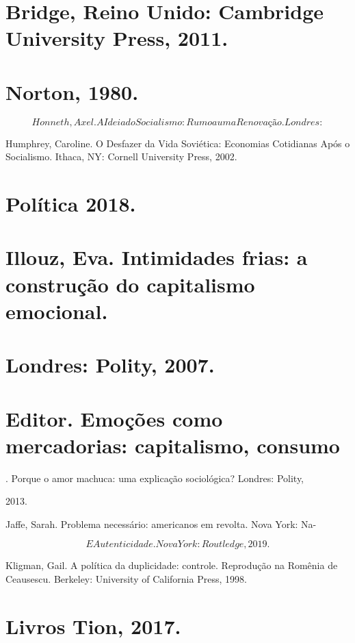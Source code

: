 \section{Bridge, Reino Unido: Cambridge University Press, 2011.}
 \par 
\section{Norton, 1980.}
 \par 
\[Honneth, Axel. A Ideia do Socialismo: Rumo a uma Renovação. Londres:\]
 \par 
Humphrey, Caroline. O Desfazer da Vida Soviética: Economias Cotidianas Após o Socialismo. Ithaca, NY: Cornell University Press, 2002.
 \par 
\section{Política 2018.}
 \par 
\section{Illouz, Eva. Intimidades frias: a construção do capitalismo emocional.}
 \par 
\section{Londres: Polity, 2007.}
 \par 
\section{Editor. Emoções como mercadorias: capitalismo, consumo}
 \par 
. Porque o amor machuca: uma explicação sociológica? Londres: Polity,
 \par 
2013.
 \par 
Jaffe, Sarah. Problema necessário: americanos em revolta. Nova York: Na-
 \par 
\[E Autenticidade. Nova York: Routledge, 2019.\]
 \par 
Kligman, Gail. A política da duplicidade: controle. Reprodução na Romênia de Ceausescu. Berkeley: University of California Press, 1998.
 \par 
\section{Livros Tion, 2017.}
 \par 
